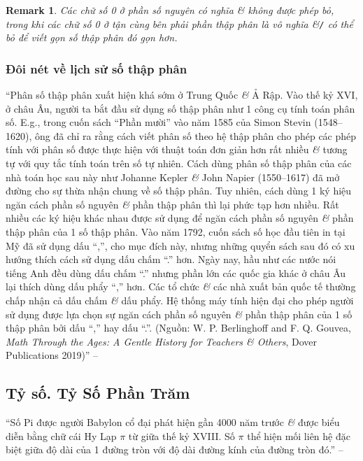 \documentclass{article}
\numberwithin{equation}{section}
\newtheorem{remark}{Remark}[section]
\begin{document}
\begin{remark}
	Các chữ số 0 ở phần số nguyên có nghĩa \textit{\&} không được phép bỏ, trong khi các chữ số 0 ở tận cùng bên phải phần thập phân là vô nghĩa \&\emph{\texttt{/}} có thể bỏ để viết gọn số thập phân đó gọn hơn.
\end{remark}

\subsubsection{Đôi nét về lịch sử số thập phân}
``Phân số thập phân xuất hiện khá sớm ở Trung Quốc \textit{\&} Ả Rập. Vào thế kỷ XVI, ở châu Âu, người ta bắt đầu sử dụng số thập phân như 1 công cụ tính toán phân số. E.g., trong cuốn sách ``Phần mười'' vào năm 1585 của Simon Stevin (1548--1620), ông đã chỉ ra rằng cách viết phân số theo hệ thập phân cho phép các phép tính với phân số được thực hiện với thuật toán đơn giản hơn rất nhiều \textit{\&} tương tự với quy tắc tính toán trên số tự nhiên. Cách dùng phân số thập phân của các nhà toán học sau này như Johanne Kepler \textit{\&} John Napier (1550--1617) đã mở đường cho sự thừa nhận chung về số thập phân. Tuy nhiên, cách dùng 1 ký hiệu ngăn cách phần số nguyên \textit{\&} phần thập phân thì lại phức tạp hơn nhiều. Rất nhiều các ký hiệu khác nhau được sử dụng để ngăn cách phần số nguyên \textit{\&} phần thập phân của 1 số thập phân. Vào năm 1792, cuốn sách số học đầu tiên in tại Mỹ đã sử dụng dấu ``,'', cho mục đích này, nhưng những quyển sách sau đó có xu hướng thích cách sử dụng dấu chấm ``.'' hơn. Ngày nay, hầu như các nước nói tiếng Anh đều dùng dấu chấm ``.'' nhưng phần lớn các quốc gia khác ở châu Âu lại thích dùng dấu phẩy ``,'' hơn. Các tổ chức \textit{\&} các nhà xuất bản quốc tế thường chấp nhận cả dấu chấm \textit{\&} dấu phẩy. Hệ thống máy tính hiện đại cho phép người sử dụng được lựa chọn sự ngăn cách phần số nguyên \textit{\&} phần thập phân của 1 số thập phân bởi dấu ``,'' hay dấu ``.''. (Nguồn: W. P. Berlinghoff and F. Q. Gouvea, \textit{Math Through the Ages: A Gentle History for Teachers \textit{\&} Others}, Dover Publications 2019)'' -- \cite[p. 60]{Thai_Anh_Dat_Ha_Loan_Nam_Quang_Toan_6_tap_2}

\subsection{Tỷ số. Tỷ Số Phần Trăm}
``Số Pi được người Babylon cổ đại phát hiện gần 4000 năm trước \textit{\&} được biểu diễn bằng chữ cái Hy Lạp $\pi$ từ giữa thế kỷ XVIII. Số $\pi$ thể hiện mối liên hệ đặc biệt giữa độ dài của 1 đường tròn với độ dài đường kính của đường tròn đó.'' -- \cite[p. 61]{Thai_Anh_Dat_Ha_Loan_Nam_Quang_Toan_6_tap_2}
\end{document}
